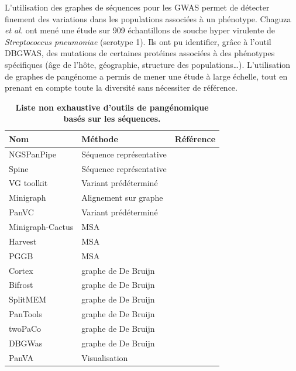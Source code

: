 L'utilisation des graphes de séquences pour les GWAS permet de détecter finement des variations dans les populations associées à un phénotype. Chaguza \textit{et al.} \cite{chaguza_bacterial_2020} ont mené une étude sur 909 échantillons de souche hyper virulente de \textit{Streptococcus pneumoniae} (serotype 1). Ils ont pu identifier, grâce à l'outil DBGWAS, des mutations de certaines protéines associées à des phénotypes spécifiques (âge de l'hôte, géographie, structure des populations\dots). L'utilisation de graphes de pangénome a permis de mener une étude à large échelle, tout en prenant en compte toute la diversité sans nécessiter de référence.

\begin{table}[htbp]
    \centering
    \begin{tabular}{|p{}|p{}|p{}|}
        \hline
        Nom & Méthode & Référence \\
        \hline
        NGSPanPipe & Séquence représentative & \cite{kulsum_ngspanpipe_2018} \\
        \hline
        Spine & Séquence représentative & \cite{ozer_characterization_2014}\\
        \hline
        VG toolkit & Variant prédéterminé & \cite{garrison_variation_2018} \\
        \hline
        Minigraph & Alignement sur graphe & \cite{li_design_2020} \\
        \hline
        PanVC & Variant prédéterminé & \cite{norri_founder_2021} \\
        \hline
        Minigraph-Cactus & MSA & \cite{hickey_pangenome_2024}\\
        \hline
        Harvest & MSA & \cite{treangen_harvest_2014} \\
        \hline
        PGGB & MSA & \cite{garrison_building_2024}\\
        \hline
        Cortex & graphe de De Bruijn & \cite{iqbal_novo_2012} \\
        \hline
        Bifrost & graphe de De Bruijn & \cite{holley_bifrost_2020} \\
        \hline
        SplitMEM & graphe de De Bruijn & \cite{marcus_splitmem_2014} \\
        \hline
        PanTools & graphe de De Bruijn & \cite{sheikhizadeh_pantools_2016} \\
        \hline
        twoPaCo & graphe de De Bruijn & \cite{minkin_twopaco_2017}\\
        \hline
        DBGWas & graphe de De Bruijn & \cite{jaillard_fast_2018}\\
        \hline
        PanVA & Visualisation & \cite{van_den_brandt_panva_2024} \\
        \hline
    \end{tabular}
    \caption[Outils de pangénomique basés sur les séquences]{\textbf{Liste non exhaustive d'outils de pangénomique basés sur les séquences.}}
    \label{tab:pangenomicToolsSeq}
\end{table}